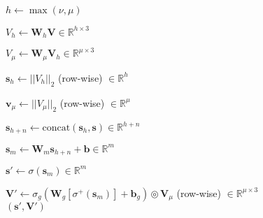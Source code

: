\hline
\begin{algorithmic}
\renewcommand{\algorithmicrequire}{\textbf{Input:}}
\renewcommand{\algorithmicensure}{\textbf{Output:}}
\State $h \gets \max(\nu, \mu)$

\State $V_h \gets \mathbf{W}_h\mathbf{V} \in \mathbb{R}^{h\times3}$

\State $V_{\mu} \gets \mathbf{W}_{\mu}\mathbf{V}_h \in \mathbb{R}^{\mu\times 3}$

\State $\mathbf{s}_h\gets ||V_h||_2$ (row-wise) $\in \mathbb{R}^h$

\State $\mathbf{v}_{\mu} \gets ||V_{\mu}||_2$ (row-wise) $\in \mathbb{R}^{\mu}$

\State $\mathbf{s}_{h + n} \gets \text{concat}(\mathbf{s}_h, \mathbf{s})\in\mathbb{R}^{h + n}$

\State $\mathbf{s}_m \gets \mathbf{W}_m\mathbf{s}_{h+n}+\mathbf{b}\in \mathbb{R}^m$

\State $\mathbf{s}' \gets \sigma(\mathbf{s}_m)\in \mathbb{R}^m $

\State $\mathbf{V}' \gets \sigma_g(\mathbf{W}_g[\sigma^{+}(\mathbf{s}_m)] + \mathbf{b}_g) \circledcirc \mathbf{V}_{\mu}$ (row-wise) $\in \mathbb{R}^{\mu \times 3}$
\\
\Return $(\mathbf{s}', \mathbf{V}')$
\end{algorithmic}
\hline

